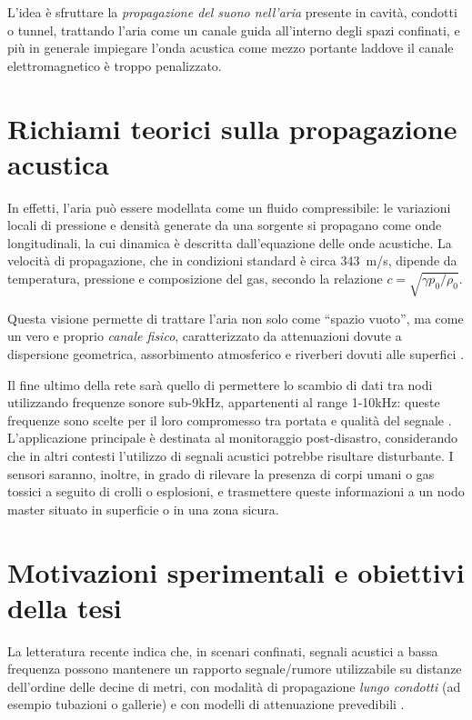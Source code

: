 L’idea è sfruttare la \emph{propagazione del suono nell’aria} presente in cavità, condotti o tunnel, trattando l’aria 
come un canale guida all'interno degli spazi confinati, e più in generale impiegare l’onda acustica come 
mezzo portante laddove il canale elettromagnetico è troppo penalizzato. 

\section{Richiami teorici sulla propagazione acustica}
In effetti, l’aria può essere modellata come un fluido compressibile: le variazioni locali di pressione e densità generate da una sorgente si propagano come onde longitudinali, 
la cui dinamica è descritta dall’equazione delle onde acustiche. 
La velocità di propagazione, che in condizioni standard 
è circa \SI{343}{m/s}, dipende da temperatura, pressione e composizione del gas, secondo la relazione 
$c = \sqrt{\gamma p_0 / \rho_0}$. 

Questa visione permette di trattare l’aria non solo come “spazio vuoto”, ma come un 
vero e proprio \emph{canale fisico}, caratterizzato da attenuazioni dovute a dispersione geometrica, assorbimento atmosferico 
e riverberi dovuti alle superfici \citep{Kinsler,MorseIngard,Pierce}. 

Il fine ultimo della rete sarà quello di permettere lo scambio di dati tra nodi utilizzando frequenze sonore sub-9kHz, appartenenti al range 1-10kHz: 
queste frequenze sono scelte per il loro compromesso tra portata e qualità del segnale \citep{Heifetz2017ANL}. 
L'applicazione principale è destinata al monitoraggio post-disastro, considerando che in altri contesti l'utilizzo di segnali acustici potrebbe risultare disturbante. 
I sensori saranno, inoltre, in grado di rilevare la presenza di corpi umani o gas tossici a seguito di crolli o esplosioni,
e trasmettere queste informazioni a un nodo master situato in superficie o in una zona sicura. 

\section{Motivazioni sperimentali e obiettivi della tesi}
La letteratura recente indica che, in scenari confinati, segnali acustici a bassa frequenza possono mantenere 
un rapporto segnale/rumore utilizzabile su distanze dell'ordine delle decine di metri, con modalità di propagazione 
\emph{lungo condotti} (ad esempio tubazioni o gallerie) e con modelli di attenuazione prevedibili 
\citep{acoustic2024}.  

